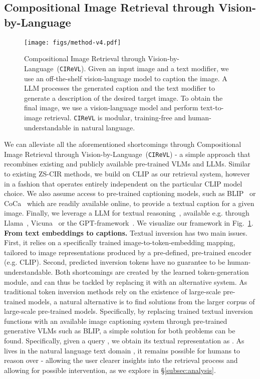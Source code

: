 \documentclass{article} \usepackage{iclr2024_conference,times}
\newcommand{\acronym}{{Compositional Image Retrieval through Vision-by-Language}}
\newcommand{\methodName}{\texttt{CIReVL}\xspace} \newcommand{\methodNameNS}{\texttt{CIReVL}}
\begin{document}
\subsection{Compositional Image Retrieval through Vision-by-Language}
\label{subsec:method}
\begin{figure}
    \centering
    \texttt{[image: figs/method-v4.pdf]}
    \caption{
    \acronym\ (\methodNameNS). Given an input image and a text modifier, we use an off-the-shelf vision-language model to caption the image. A LLM processes the generated caption and the text modifier to generate a description of the desired target image. To obtain the final image, we use a vision-language model and perform text-to-image retrieval. \methodName is modular, training-free and human-understandable in natural language.}
    \label{fig:method}
\vspace{-5pt}
\end{figure} We can alleviate all the aforementioned shortcomings through \acronym\ (\methodNameNS) - a simple approach that recombines existing and publicly available pre-trained VLMs and LLMs. 
Similar to existing ZS-CIR methods, we build on CLIP as our retrieval system, however in a fashion that operates entirely independent on the particular CLIP model choice.
We also assume access to pre-trained captioning models, such as BLIP~\citep{blip,blip2} or CoCa~\citep{coca} which are readily available online, to provide a textual caption for a given image. Finally, we leverage a LLM for textual reasoning~\citep{huang2022towards}, available e.g. through Llama~\citep{llama2}, Vicuna~\citep{vicuna2023} or the GPT-framework~\citep{gpt-3}. We visualize our framework in Fig.~\ref{fig:method}.\\

\textbf{From text embeddings to captions.} Textual inversion has two main issues. First, it relies on a specifically trained image-to-token-embedding mapping, tailored to image representations produced by a pre-defined, pre-trained encoder (e.g. CLIP). Second, predicted inversion tokens have no guarantee to be human-understandable.
Both shortcomings are created by the learned token-generation module, and can thus be tackled by replacing it with an alternative system.
As traditional token inversion methods rely on the existence of large-scale pre-trained models, a natural alternative is to find solutions from the larger corpus of large-scale pre-trained models.
Specifically, by replacing trained textual inversion functions with an available image captioning system  through pre-trained generative VLMs such as BLIP, a simple solution for both problems can be found.  Specifically, given a query , we obtain its textual representation as . As  lives in the natural language text domain , it remains possible for humans to reason over - allowing the user clearer insights into the retrieval process and allowing for possible intervention, as we explore in \S\ref{subsec:analysis}.
\end{document}

